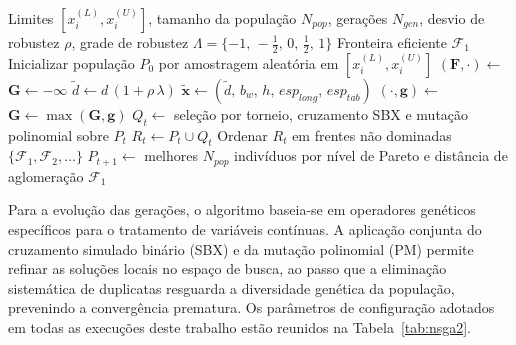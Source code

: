  \begin{algorithm}[!ht]
 \caption{Otimização robusta multiobjetivo via NSGA-II}
 \label{alg:nsga2}
 \begin{algorithmic}[1]
 \Require Limites $[x_i^{(L)}, x_i^{(U)}]$, tamanho da população $N_{pop}$, gerações $N_{gen}$, desvio de robustez $\rho$, grade de robustez $\Lambda = \{-1,\,-\tfrac{1}{2},\,0,\,\tfrac{1}{2},\,1\}$
 \Ensure Fronteira eficiente $\mathcal{F}_1$
 \State Inicializar população $P_0$ por amostragem aleatória em $[x_i^{(L)}, x_i^{(U)}]$
     \State $(\mathbf{F}, \cdot) \gets$  
     \State $\mathbf{G} \gets -\boldsymbol{\infty}$
      
       \State $\tilde{d} \gets d\,(1 + \rho\,\lambda)$
       \State $\tilde{\mathbf{x}} \gets (\tilde{d},\,b_w,\,h,\,esp_{long},\,esp_{tab})$
       \State $(\cdot, \mathbf{g}) \gets$ 
       \State $\mathbf{G} \gets \max(\mathbf{G}, \mathbf{g})$ 
     \EndFor
   \EndFor
   \State $Q_t \gets$ seleção por torneio, cruzamento SBX e mutação polinomial sobre $P_t$
   \State $R_t \gets P_t \cup Q_t$
   \State Ordenar $R_t$ em frentes não dominadas $\{\mathcal{F}_1, \mathcal{F}_2, \ldots\}$
   \State $P_{t+1} \gets$ melhores $N_{pop}$ indivíduos por nível de Pareto e distância de aglomeração
 \EndFor
 \State \Return $\mathcal{F}_1$
 \end{algorithmic}
 \end{algorithm}

Para a evolução das gerações, o algoritmo baseia-se em operadores genéticos específicos para o tratamento de variáveis contínuas.
A aplicação conjunta do cruzamento simulado binário (SBX) e da mutação polinomial (PM) permite refinar as soluções locais no espaço de busca, ao passo que a eliminação sistemática de duplicatas resguarda a diversidade genética da população, prevenindo a convergência prematura.
Os parâmetros de configuração adotados em todas as execuções deste trabalho estão reunidos na Tabela~\ref{tab:nsga2}.

